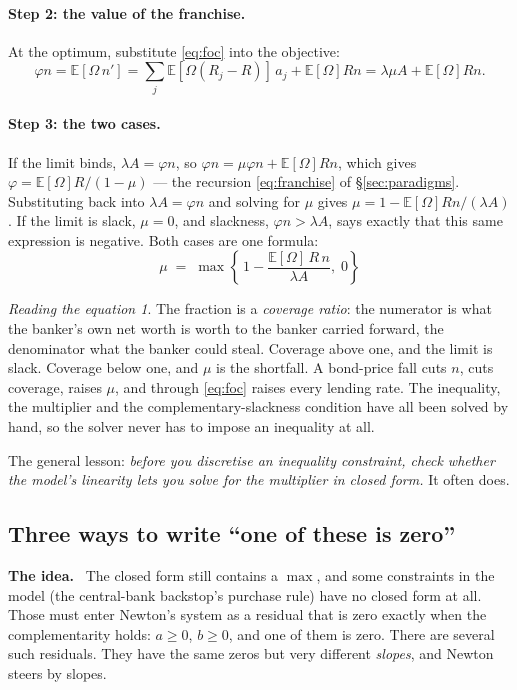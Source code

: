 \documentclass[10pt,a4paper]{article}
\newenvironment{idea}{\begin{shaded}\noindent\textbf{The idea.}\ }{\end{shaded}}
\theoremstyle{plain}
\theoremstyle{remark}
\newtheorem*{reading}{Reading the equation}
\newcommand{\E}{\mathbb{E}}
\begin{document}
\paragraph{Step 2: the value of the franchise.} At the optimum, substitute \eqref{eq:foc} into the
objective:
\[
  \varphi n = \E[\Omega\,n'] = \sum_j \E[\Omega(R_j-R)]\,a_j + \E[\Omega]Rn
  = \lambda\mu A + \E[\Omega]Rn .
\]

\paragraph{Step 3: the two cases.} If the limit binds, $\lambda A=\varphi n$, so
$\varphi n = \mu\varphi n + \E[\Omega]Rn$, which gives $\varphi = \E[\Omega]R/(1-\mu)$ ---
the recursion \eqref{eq:franchise} of \S\ref{sec:paradigms}. Substituting back into
$\lambda A=\varphi n$ and solving for $\mu$ gives $\mu = 1-\E[\Omega]Rn/(\lambda A)$. If the limit is
slack, $\mu=0$, and slackness, $\varphi n > \lambda A$, says exactly that this same expression is
negative. Both cases are one formula:
\begin{equation}
  \boxed{\;\mu \;=\; \max\left\{\,1-\frac{\E[\Omega]\,R\,n}{\lambda A},\;0\right\}\;}
  \label{eq:muclosed}
\end{equation}

\begin{reading}
The fraction is a \emph{coverage ratio}: the numerator is what the banker's own net worth is worth
to the banker carried forward, the denominator what the banker could steal. Coverage above one,
and the limit is slack. Coverage below one, and $\mu$ is the shortfall. A bond-price fall cuts
$n$, cuts coverage, raises $\mu$, and through \eqref{eq:foc} raises every lending rate. The
inequality, the multiplier and the complementary-slackness condition have all been solved by
hand, so the solver never has to impose an inequality at all.
\end{reading}

\noindent The general lesson: \emph{before you discretise an inequality constraint, check whether
the model's linearity lets you solve for the multiplier in closed form.} It often does.

\subsection{Three ways to write ``one of these is zero''}

\begin{idea}
The closed form still contains a $\max$, and some constraints in the model (the central-bank
backstop's purchase rule) have no closed form at all. Those must enter Newton's system as a
residual that is zero exactly when the complementarity holds: $a\ge0$, $b\ge0$, and one of them is
zero. There are several such residuals. They have the same zeros but very different
\emph{slopes}, and Newton steers by slopes.
\end{idea}
\end{document}
